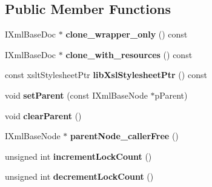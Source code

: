 \subsection*{\-Public \-Member \-Functions}
\begin{DoxyCompactItemize}
\item 
\hypertarget{classgeneral__server_1_1LibXslDoc_ad4526dada1d74dc96ee0fb44110a8946}{\-I\-Xml\-Base\-Doc $\ast$ {\bfseries clone\-\_\-wrapper\-\_\-only} () const }\label{classgeneral__server_1_1LibXslDoc_ad4526dada1d74dc96ee0fb44110a8946}

\item 
\hypertarget{classgeneral__server_1_1LibXslDoc_aa979e94f9cb078f0d056598b58017cdd}{\-I\-Xml\-Base\-Doc $\ast$ {\bfseries clone\-\_\-with\-\_\-resources} () const }\label{classgeneral__server_1_1LibXslDoc_aa979e94f9cb078f0d056598b58017cdd}

\item 
\hypertarget{classgeneral__server_1_1LibXslDoc_a07b6bf771892abe7de6a53e86ce00473}{const xslt\-Stylesheet\-Ptr {\bfseries lib\-Xsl\-Stylesheet\-Ptr} () const }\label{classgeneral__server_1_1LibXslDoc_a07b6bf771892abe7de6a53e86ce00473}

\item 
\hypertarget{classgeneral__server_1_1LibXslDoc_a184ac71f61c5b8858060675bf53c2cb8}{void {\bfseries set\-Parent} (const \-I\-Xml\-Base\-Node $\ast$p\-Parent)}\label{classgeneral__server_1_1LibXslDoc_a184ac71f61c5b8858060675bf53c2cb8}

\item 
\hypertarget{classgeneral__server_1_1LibXslDoc_a7871079f0cd849974c95f185451b7c20}{void {\bfseries clear\-Parent} ()}\label{classgeneral__server_1_1LibXslDoc_a7871079f0cd849974c95f185451b7c20}

\item 
\hypertarget{classgeneral__server_1_1LibXslDoc_aafd2af2530ae50d2bb99ba68b5925a3a}{\-I\-Xml\-Base\-Node $\ast$ {\bfseries parent\-Node\-\_\-caller\-Free} ()}\label{classgeneral__server_1_1LibXslDoc_aafd2af2530ae50d2bb99ba68b5925a3a}

\item 
\hypertarget{classgeneral__server_1_1LibXslDoc_aa6bfcd81d9a1b38dad362e61811735fe}{unsigned int {\bfseries increment\-Lock\-Count} ()}\label{classgeneral__server_1_1LibXslDoc_aa6bfcd81d9a1b38dad362e61811735fe}

\item 
\hypertarget{classgeneral__server_1_1LibXslDoc_a24118269e27e5583b03c828cdd06e84a}{unsigned int {\bfseries decrement\-Lock\-Count} ()}\label{classgeneral__server_1_1LibXslDoc_a24118269e27e5583b03c828cdd06e84a}


\end{DoxyCompactItemize}
